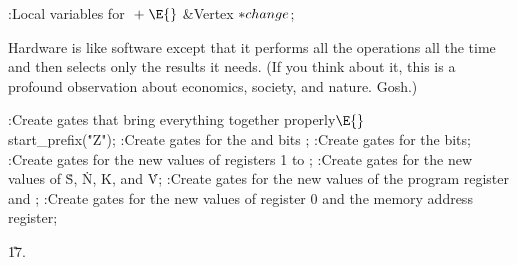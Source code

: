 \B{}:Local variables for \X${}\mathrel+\E{}$\6
\&{Vertex} ${}{*}\\{change}{}$;\par
\fi

Hardware is like software except that it performs all the operations
all the time and then selects only the results it needs. (If you think about
it, this is a profound observation about economics, society, and nature.
Gosh.)

\Y\B\4:Create gates that bring everything together properly\X${}\E{}$\6
\\{start\_prefix}(\.{"Z"});\6
:Create gates for the  and  bits%
\X;\6
:Create gates for the  bits\X;\6
:Create gates for the new values of registers 1 to \X;\6
:Create gates for the new values of \.S, \.N, \.K, and \.V\X;\6
:Create gates for the new values of the program register and %
\X;\6
:Create gates for the new values of register 0 and the memory address
register\X;\par
\U17.\fi

